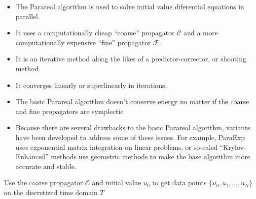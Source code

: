 \documentclass{article}
\begin{document}
            \begin{itemize}
                \item The Parareal algorithm is used to solve initial value diferential equations in parallel.
                \item It uses a computationally cheap ``coarse'' propagator $\mathcal{C}$ and a more computationally expensive ``fine'' propagator $\mathcal{F}$.
                \item It is an iterative method along the likes of a predictor-corrector, or shooting method.
                \item It converges linearly or superlinearly in iterations.
                \item The basic Parareal algorithm doesn't conserve energy no matter if the coarse and fine propagators are symplectic
                \item Because there are several drawbacks to the basic Parareal algorithm, variants have been developed to address some of these issues.  For example, ParaExp uses exponential matrix integration on linear problems, or so-caled ``Krylov-Enhanced'' methods use geometric methods to make the base algorithm more accurate and stable.
            \end{itemize}

            \begin{algorithm}
                \caption{The Parareal Algorithm}
                Use the coarse propagator $\mathcal{C}$ and initial value $u_0$ to get data points $\{u_0, u_1, \ldots, u_N\}$ on the discretized time domain $T$\;
                
            \end{algorithm}
\end{document}
